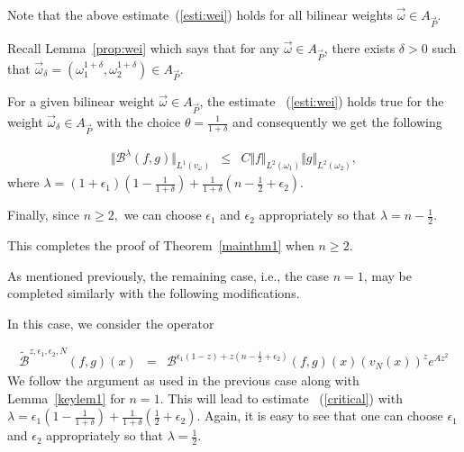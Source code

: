 \documentclass[a4paper,12pt]{amsart}
\begin{document}
Note that the above estimate~(\ref{esti:wei}) holds for all bilinear weights $\vec{\omega}\in A_{\vec{P}}$. 

Recall Lemma~\ref{prop:wei} which says that for any $\vec{\omega}\in A_{\vec{P}}$, there exists $\delta>0$ such that $\vec{\omega}_{\delta}=(\omega_{1}^{1+\delta},\omega_{2}^{1+\delta})\in A_{\vec{P}}$. 

For a given bilinear weight $\vec{\omega}\in A_{\vec{P}}$, the estimate ~(\ref{esti:wei}) holds true for the weight $\vec{\omega}_{\delta}\in A_{\vec{P}}$ with the choice $\theta=\frac{1}{1+\delta}$ and consequently we get the following

\begin{eqnarray}\label{critical}
\Vert \mathcal {B}^{\lambda}(f,g)\Vert_{L^{1}(v_{\omega})}
&\leq & C \Vert f\Vert_{L^{2}(\omega_{1})}\Vert g\Vert_{L^{2}(\omega_{2})},
\end{eqnarray} 
where $\lambda=(1+\epsilon_{1})(1-\frac{1}{1+\delta})+\frac{1}{1+\delta}(n-\frac{1}{2}+\epsilon_{2})$.

Finally, since $n\geq 2,$ we can choose $\epsilon_1$ and $\epsilon_2$ appropriately so that $\lambda=n-\frac{1}{2}.$ 
 
This completes the proof of Theorem~\ref{mainthm1} when $n\geq 2$. 
 
 As mentioned previously, the remaining case, i.e., the case $n=1$, may be completed similarly with the following modifications. 
 
 In this case, we consider the operator 
 
\begin{eqnarray*}
\tilde{\mathcal {B}}^{z,\epsilon_{1},\epsilon_{2},N}(f,g)(x)
&=&\mathcal {B}^{\epsilon_{1}(1-z)+z(n-\frac{1}{2}+\epsilon_{2})}(f,g)(x)(v_{N}(x))^{z}e^{A z^{2}}
\end{eqnarray*} 
We follow the argument as used in the  previous case along with Lemma~\ref{keylem1} for $n=1$. This will lead to estimate ~(\ref{critical}) with $\lambda=\epsilon_{1}(1-\frac{1}{1+\delta})+\frac{1}{1+\delta}(\frac{1}{2}+\epsilon_{2})$. Again, it is easy to see that one can choose 
$\epsilon_1$ and $\epsilon_2$ appropriately so that $\lambda=\frac{1}{2}.$
\end{document}
